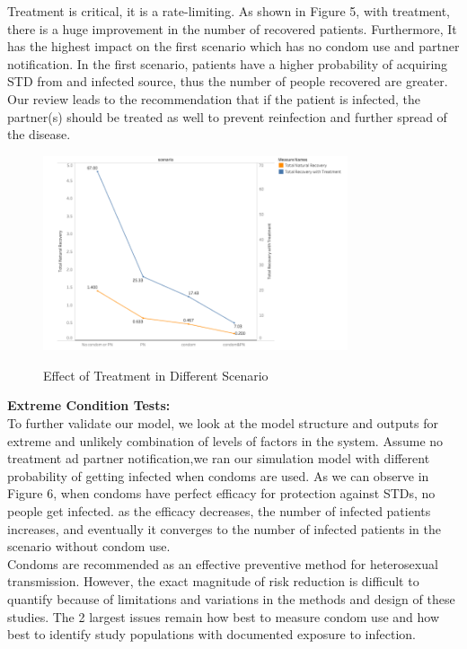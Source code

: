 \documentclass{article}
\begin{document}
\begin{normalsize}
 Treatment is critical, it is a rate-limiting. As shown in Figure 5, with treatment, there is a huge improvement in the number of recovered patients. Furthermore, It has the highest impact on the first scenario which has no condom use and partner notification. In the first scenario, patients have a higher probability of acquiring STD from and infected source, thus the number of people recovered are greater.  Our review leads to the recommendation that if the patient is infected, the partner(s) should be treated as well to prevent reinfection and further spread of the disease.
 
\begin{figure}[H]
\caption{Effect of Treatment in Different Scenario}
\includegraphics[width=0.8\textwidth]{plt4.png}
\centering
\label{fig:plt4}
\end{figure}


\textbf{Extreme Condition Tests:}\\

To further validate our model, we look at the model structure and outputs for extreme and unlikely combination of levels of factors in the system. Assume no treatment ad partner notification,we ran our simulation model with different probability of getting infected when condoms are used. As we can observe in Figure 6, when condoms have perfect efficacy for protection against STDs, no people get infected. as the efficacy decreases, the number of infected patients increases, and eventually it converges to the number of infected patients in the scenario without condom use.\\ 

Condoms are recommended as an effective preventive method for heterosexual transmission. However, the exact magnitude of risk reduction is difficult to quantify because of limitations and variations in the methods and design of these studies. The 2 largest issues remain how best to measure condom use and how best to identify study populations with documented exposure to infection. 


\end{normalsize}
\end{document}
